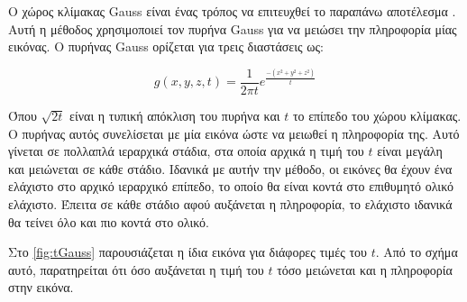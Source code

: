 \documentclass[a4paper,12pt]{article}
\begin{document}
Ο χώρος κλίμακας Gauss είναι ένας τρόπος να επιτευχθεί το παραπάνω αποτέλεσμα
\cite{scale_space:1}. Αυτή η μέθοδος χρησιμοποιεί τον πυρήνα Gauss για να
μειώσει την πληροφορία μίας εικόνας. Ο πυρήνας Gauss ορίζεται για τρεις
διαστάσεις ως:

\begin{equation*}
    g(x,y,z,t) = \frac{1} {2 \pi t} e^{\frac{-(x^2 + y^2 + z^2) }{t}}
\end{equation*}

Όπου $\sqrt{2t}$ είναι η τυπική απόκλιση του πυρήνα και $t$ το επίπεδο του χώρου
κλίμακας. Ο πυρήνας αυτός συνελίσεται με μία εικόνα ώστε να μειωθεί η πληροφορία
της. Αυτό γίνεται σε πολλαπλά ιεραρχικά στάδια, στα οποία αρχικά η τιμή του $t$
είναι μεγάλη και μειώνεται σε κάθε στάδιο. Ιδανικά με αυτήν την μέθοδο, οι
εικόνες θα έχουν ένα ελάχιστο στο αρχικό ιεραρχικό επίπεδο, το οποίο θα είναι
κοντά στο επιθυμητό ολικό ελάχιστο. Έπειτα σε κάθε στάδιο αφού αυξάνεται η
πληροφορία, το ελάχιστο ιδανικά θα τείνει όλο και πιο κοντά στο ολικό.

Στο \autoref{fig:tGauss} παρουσιάζεται η ίδια εικόνα για διάφορες τιμές του $t$.
Από το σχήμα αυτό, παρατηρείται ότι όσο αυξάνεται η τιμή του $t$ τόσο μειώνεται
και η πληροφορία στην εικόνα.
\end{document}
